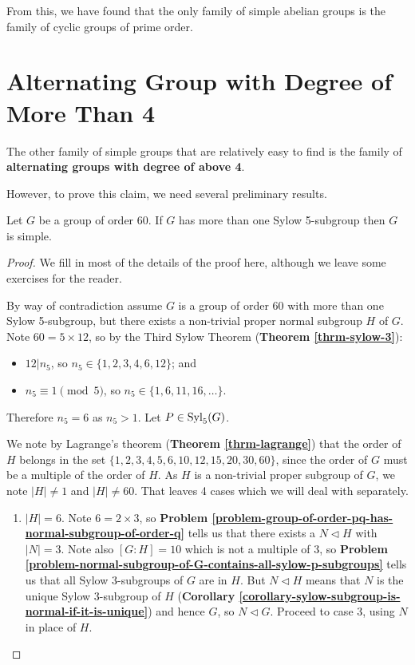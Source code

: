 From this, we have found that the only family of simple abelian groups is the family of cyclic groups of prime order.

\section{Alternating Group with Degree of More Than 4}
The other family of simple groups that are relatively easy to find is the family of \textbf{alternating groups with degree of above 4}.

However, to prove this claim, we need several preliminary results.

\begin{lemma}
    Let $G$ be a group of order 60. If $G$ has more than one Sylow 5-subgroup then $G$ is simple.
\end{lemma}
\begin{proof}
    We fill in most of the details of the proof here, although we leave some exercises for the reader.

    By way of contradiction assume $G$ is a group of order 60 with more than one Sylow 5-subgroup, but there exists a non-trivial proper normal subgroup $H$ of $G$. Note $60 = 5 \times 12$, so by the Third Sylow Theorem (\textbf{Theorem \ref{thrm-sylow-3}}):
    \begin{itemize}
        \item $12 \vert n_5$, so $n_5 \in \{1, 2, 3, 4, 6, 12\}$; and
        \item $n_5 \equiv 1 \pmod 5$, so $n_5 \in \{1, 6, 11, 16, \dots\}$.
    \end{itemize}
    Therefore $n_5 = 6$ as $n_5 > 1$. Let $P \in \mathrm{Syl}_{5}(G)$.

    We note by Lagrange's theorem (\textbf{Theorem \ref{thrm-lagrange}}) that the order of $H$ belongs in the set $\{1, 2, 3, 4, 5, 6, 10, 12, 15, 20, 30, 60\}$, since the order of $G$ must be a multiple of the order of $H$. As $H$ is a non-trivial proper subgroup of $G$, we note $|H| \neq 1$ and $|H| \neq 60$. That leaves 4 cases which we will deal with separately.
    \begin{enumerate}
        \item $|H| = 6$. Note $6 = 2 \times 3$, so \textbf{Problem \ref{problem-group-of-order-pq-has-normal-subgroup-of-order-q}} tells us that there exists a $N \lhd H$ with $|N| = 3$. Note also $[G:H] = 10$ which is not a multiple of 3, so \textbf{Problem \ref{problem-normal-subgroup-of-G-contains-all-sylow-p-subgroups}} tells us that all Sylow 3-subgroups of $G$ are in $H$. But $N \lhd H$ means that $N$ is the unique Sylow 3-subgroup of $H$ (\textbf{Corollary \ref{corollary-sylow-subgroup-is-normal-if-it-is-unique}}) and hence $G$, so $N \lhd G$. Proceed to case 3, using $N$ in place of $H$.
        

\end{enumerate}
\end{proof}
